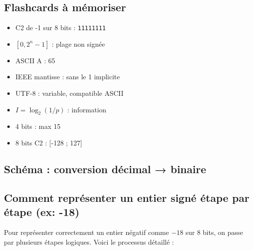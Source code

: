 \documentclass[12pt,a4paper]{article}
\begin{document}
\subsection{Flashcards à mémoriser}
\begin{multicols}{2}
\begin{itemize}
  \item C2 de -1 sur 8 bits : \texttt{11111111}
  \item $[0, 2^n - 1]$ : plage non signée
  \item ASCII A : 65
  \item IEEE mantisse : sans le 1 implicite
  \item UTF-8 : variable, compatible ASCII
  \item $I = \log_2(1/p)$ : information
  \item 4 bits : max 15
  \item 8 bits C2 : [-128 ; 127]
\end{itemize}
\end{multicols}

\subsection{Schéma : conversion décimal → binaire}
\begin{center}
\end{center}

\newpage

\subsection{Comment représenter un entier signé étape par étape (ex: -18)}
Pour représenter correctement un entier négatif comme $-18$ sur 8 bits, on passe par plusieurs étapes logiques. Voici le processus détaillé :
\end{document}
